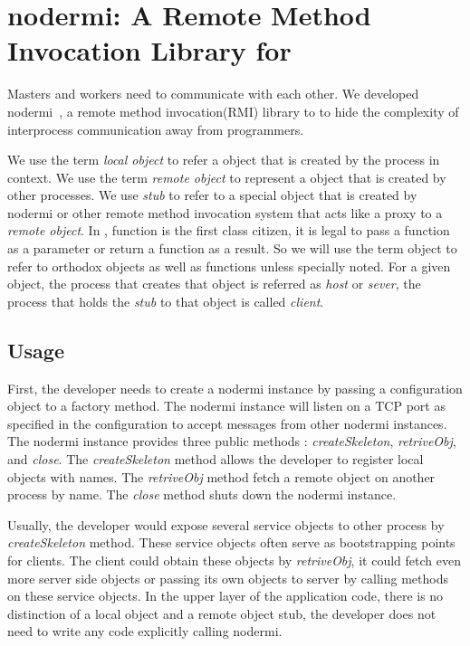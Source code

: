 \chapter{nodermi: A Remote Method Invocation Library for \nodejs{}}

Masters and workers need to communicate with each other.
We developed nodermi~\cite{nodermi}, a remote method invocation(RMI) library to
to hide the complexity of interprocess communication away from
programmers.

We use the term \emph{local object}
to refer a object that is created by the process in context.
We use the term \emph{remote object} to represent a object that is
created by other processes.
We use \emph{stub} to refer to a special object that is created
by nodermi or other remote method invocation system that
acts like a proxy to a \emph{remote object}.
In \js{}, function is the first class citizen, it is legal
to pass a function as a parameter or return a function as a result.
So we will use the term object to refer to orthodox objects as well as
functions unless specially noted.
For a given object, the process that creates that object is referred 
as \emph{host} or \emph{sever}, 
the process that holds the \emph{stub} to that object is called \emph{client}.


\section{Usage}
First, the developer needs to create a nodermi instance by passing a configuration
object to a factory method.
The nodermi instance will listen on a TCP port as specified in the configuration
to accept messages from other nodermi instances.
The nodermi instance provides three public methods : \emph{createSkeleton},
\emph{retriveObj}, and \emph{close}.
The \emph{createSkeleton} method allows the developer to register local objects
with names.
The \emph{retriveObj} method fetch a remote object on another process by name.
The \emph{close} method shuts down the nodermi instance.

Usually, the developer would expose several service objects to other process
by \emph{createSkeleton} method.
These service objects often serve as bootstrapping points for clients.
The client could obtain these objects by \emph{retriveObj},
it could fetch even more server side objects or passing its own objects to server
by calling methods on these service objects.
In the upper layer of the application code,
there is no distinction of a local object and a remote object stub,
the developer does not need to write any code explicitly calling nodermi.

